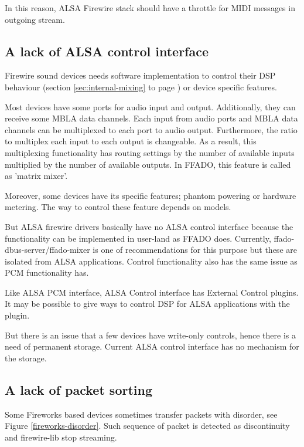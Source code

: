 \documentclass[onecolumn]{article}
\begin{document}
In this reason, ALSA Firewire stack should have a throttle for MIDI messages in outgoing stream.

\subsection{A lack of ALSA control interface}

Firewire sound devices needs software implementation to control their DSP behaviour (section \ref{sec:internal-mixing} to page \pageref{sec:internal-mixing}) or device specific features.

Most devices have some ports for audio input and output. Additionally, they can receive some MBLA data channels. Each input from audio ports and MBLA data channels can be multiplexed to each port to audio output. Furthermore, the ratio to multiplex each input to each output is changeable. As a result, this multiplexing functionality has routing settings by the number of available inputs multiplied by the number of available outputs. In FFADO, this feature is called as 'matrix mixer'.

Moreover, some devices have its specific features; phantom powering or hardware metering. The way to control these feature depends on models.

But ALSA firewire drivers basically have no ALSA control interface because the functionality can be implemented in user-land as FFADO does. Currently, ffado-dbus-server/ffado-mixer is one of recommendations for this purpose but these are isolated from ALSA applications. Control functionality also has the same issue as PCM functionality has.

Like ALSA PCM interface, ALSA Control interface has External Control plugins. It may be possible to give ways to control DSP for ALSA applications with the plugin.

But there is an issue that a few devices have write-only controls, hence there is a need of permanent storage. Current ALSA control interface has no mechanism for the storage.

\subsection{A lack of packet sorting}
Some Fireworks based devices sometimes transfer packets with disorder, see Figure \ref{fireworks-disorder}. Such sequence of packet is detected as discontinuity and firewire-lib stop streaming.
\end{document}
